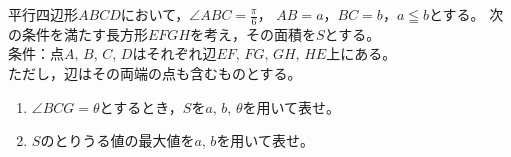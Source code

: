 \documentclass[../../main.tex]{subfiles}
\begin{document}
平行四辺形$ABCD$において，$\displaystyle \angle ABC=\frac{\pi}{6}$，
$AB=a$，$BC=b$，$a \leqq b$とする。
次の条件を満たす長方形$EFGH$を考え，その面積を$S$とする。\\
条件：点$A, \, B, \, C, \, D$はそれぞれ辺$EF, \, FG, \, GH, \, HE$上にある。\\
ただし，辺はその両端の点も含むものとする。
\begin{enumerate}
  \item$\angle BCG=\theta$とするとき，$S$を$a, \, b, \, \theta$を用いて表せ。
  \item$S$のとりうる値の最大値を$a, \, b$を用いて表せ。
\end{enumerate}
\end{document}
